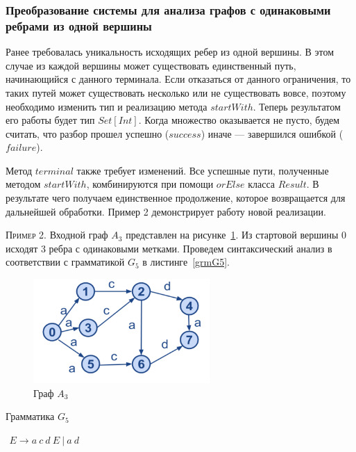 \subsubsection{Преобразование системы для анализа графов с одинаковыми ребрами из одной вершины}


Ранее требовалась уникальность исходящих ребер из одной вершины. В этом случае из каждой вершины может существовать единственный путь, начинающийся с данного терминала. Если отказаться от данного ограничения, то таких путей может существовать несколько или не существовать вовсе, поэтому необходимо изменить тип и реализацию метода $startWith$. Теперь результатом его работы будет тип $Set[Int]$. Когда множество оказывается не пусто, будем считать, что разбор прошел успешно ($success$) иначе --- завершился ошибкой ($failure$).

Метод $terminal$ также требует изменений. Все успешные пути, полученные методом $startWith$, комбинируются при помощи $orElse$ класса
$Result$. В результате чего получаем единственное продолжение, которое возвращается для дальнейшей обработки. Пример 2 демонстрирует работу новой реализации.

\textsc{Пример 2.} 
Входной граф $A_3$ представлен на рисунке~\ref{Graph3}. Из стартовой вершины 0 исходят 3 ребра с одинаковыми метками. Проведем синтаксический анализ в соответствии с грамматикой $G_5$ в листинге~\ref{grmG5}.

\begin{figure}
 \centering
 \includegraphics[width=0.6\textwidth]{Smolina/pics/Graph3.png}
 \caption{Граф $A_3$}
 \label{Graph3}
\end{figure}

\begin{listing}
\caption{Грамматика $G_5$}
\label{grmG5}
\centering
$\begin{array}{rl}
E \rightarrow a \ c \ d \ E \ | \ a \ d
\end{array}$
 \end{listing}

